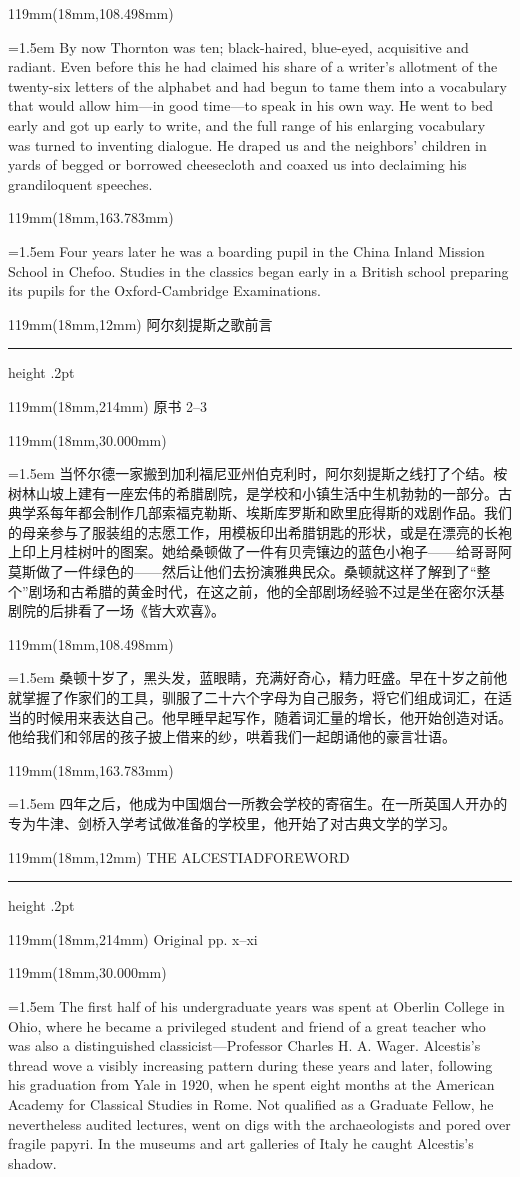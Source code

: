 \documentclass{article}
\newcommand{\ENsetup}{\normalfont\color{ink}\fontsize{11}{16.5}\selectfont\emergencystretch=1.5em}
\newcommand{\ZHsetup}{\normalfont\color{ink}\fontsize{10.5}{17}\selectfont\emergencystretch=1.5em}
\newcommand{\Block}[3]{\begin{textblock*}{119mm}(18mm,#1mm){#2 #3\par}\end{textblock*}}
\newcommand{\Heading}[3]{%
  \begin{textblock*}{119mm}(18mm,12mm)
    \color{quiet}\fontsize{7.5}{10}\selectfont
    #1\hfill #2\par\vspace{3mm}\hrule height .2pt
  \end{textblock*}
  \begin{textblock*}{119mm}(18mm,214mm)
    \color{quiet}\fontsize{7}{10}\selectfont #3\hfill\thepage
  \end{textblock*}
}
\begin{document}
\Block{108.498}{\ENsetup}{By now Thornton was ten; black-haired, blue-eyed, acquisitive and radiant. Even before this he had claimed his share of a writer's allotment of the twenty-six letters of the alphabet and had begun to tame them into a vocabulary that would allow him—in good time—to speak in his own way. He went to bed early and got up early to write, and the full range of his enlarging vocabulary was turned to inventing dialogue. He draped us and the neighbors' children in yards of begged or borrowed cheesecloth and coaxed us into declaiming his grandiloquent speeches.\par}
\Block{163.783}{\ENsetup}{Four years later he was a boarding pupil in the China Inland Mission School in Chefoo. Studies in the classics began early in a British school preparing its pupils for the Oxford-Cambridge Examinations.\par}
\newpage
\null
\Heading{阿尔刻提斯之歌}{前言}{原书 2–3}
\Block{30.000}{\ZHsetup}{当怀尔德一家搬到加利福尼亚州伯克利时，阿尔刻提斯之线打了个结。桉树林山坡上建有一座宏伟的希腊剧院，是学校和小镇生活中生机勃勃的一部分。古典学系每年都会制作几部索福克勒斯、埃斯库罗斯和欧里庇得斯的戏剧作品。我们的母亲参与了服装组的志愿工作，用模板印出希腊钥匙的形状，或是在漂亮的长袍上印上月桂树叶的图案。她给桑顿做了一件有贝壳镶边的蓝色小袍子——给哥哥阿莫斯做了一件绿色的——然后让他们去扮演雅典民众。桑顿就这样了解到了“整个”剧场和古希腊的黄金时代，在这之前，他的全部剧场经验不过是坐在密尔沃基剧院的后排看了一场《皆大欢喜》。\par }
\Block{108.498}{\ZHsetup}{桑顿十岁了，黑头发，蓝眼睛，充满好奇心，精力旺盛。早在十岁之前他就掌握了作家们的工具，驯服了二十六个字母为自己服务，将它们组成词汇，在适当的时候用来表达自己。他早睡早起写作，随着词汇量的增长，他开始创造对话。他给我们和邻居的孩子披上借来的纱，哄着我们一起朗诵他的豪言壮语。\par }
\Block{163.783}{\ZHsetup}{四年之后，他成为中国烟台一所教会学校的寄宿生。在一所英国人开办的专为牛津、剑桥入学考试做准备的学校里，他开始了对古典文学的学习。\par }
\newpage
\null
\Heading{THE ALCESTIAD}{FOREWORD}{Original pp. x–xi}
\Block{30.000}{\ENsetup}{The first half of his undergraduate years was spent at Oberlin College in Ohio, where he became a privileged student and friend of a great teacher who was also a distinguished classicist—Professor Charles H. A. Wager. Alcestis's thread wove a visibly increasing pattern during these years and later, following his graduation from Yale in 1920, when he spent eight months at the American Academy for Classical Studies in Rome. Not qualified as a Graduate Fellow, he nevertheless audited lectures, went on digs with the archaeologists and pored over fragile papyri. In the museums and art galleries of Italy he caught Alcestis's shadow.\par}
\end{document}
